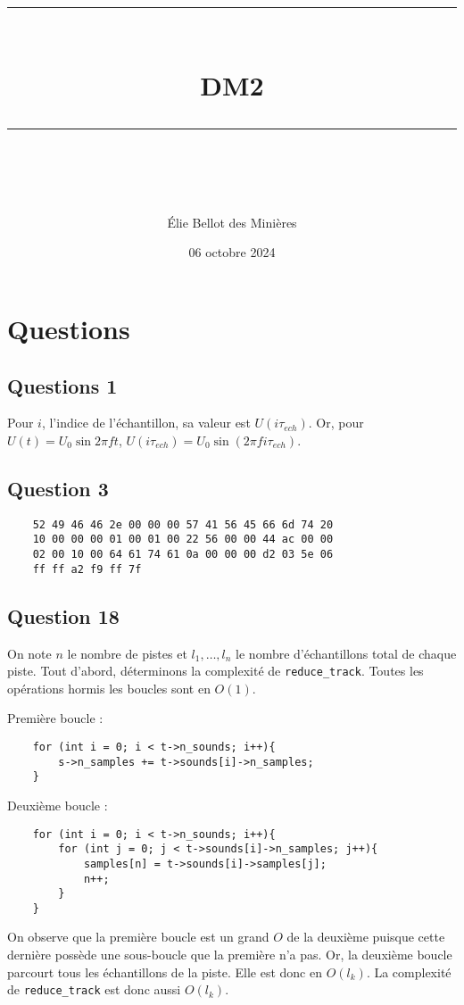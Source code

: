 \documentclass[11pt]{article} %
\title{
    \vspace{10pt} %
    \rule{\linewidth}{1pt}\\ %
    \vspace{10pt} %
    {\huge DM2}\\ %
    \rule{\linewidth}{1pt}\\ %
    \vspace{5pt} %
}
\author{Élie Bellot des Minières} %
\date{\normalsize{06 octobre 2024}} %
\begin{document}
\maketitle %
\thispagestyle{empty}
\section{Questions}
\subsection*{Questions 1}
Pour $i$, l'indice de l'échantillon, sa valeur est $U(i\tau_{ech})$. Or, pour $U(t) = U_0\sin 2\pi ft$, $U(i\tau_{ech}) = U_0\sin (2\pi fi\tau_{ech})$.

\subsection*{Question 3}
\begin{lstlisting}
    52 49 46 46 2e 00 00 00 57 41 56 45 66 6d 74 20
    10 00 00 00 01 00 01 00 22 56 00 00 44 ac 00 00
    02 00 10 00 64 61 74 61 0a 00 00 00 d2 03 5e 06
    ff ff a2 f9 ff 7f 
\end{lstlisting}

\subsection*{Question 18}
On note $n$ le nombre de pistes et $l_1, \ldots, l_n$ le nombre d'échantillons total de chaque piste.
Tout d'abord, déterminons la complexité de \texttt{reduce\_track}.
Toutes les opérations hormis les boucles sont en $O(1)$.

Première boucle :

\begin{lstlisting}
    for (int i = 0; i < t->n_sounds; i++){
        s->n_samples += t->sounds[i]->n_samples;
    }
\end{lstlisting}

Deuxième boucle :

\begin{lstlisting}
    for (int i = 0; i < t->n_sounds; i++){
        for (int j = 0; j < t->sounds[i]->n_samples; j++){
            samples[n] = t->sounds[i]->samples[j];
            n++;
        }
    }
\end{lstlisting}

On observe que la première boucle est un grand $O$ de la deuxième puisque cette dernière possède une sous-boucle que la première n'a pas. Or, la deuxième boucle parcourt tous les échantillons de la piste. Elle est donc en $O(l_k)$.
La complexité de \texttt{reduce\_track} est donc aussi $O(l_k)$.
\end{document}
